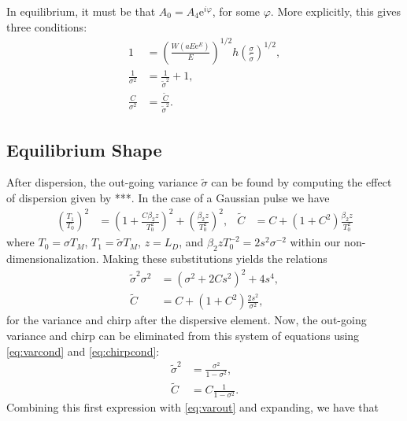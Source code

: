 In equilibrium, it must be that $A_0 = A_4 \textrm{e}^{i \varphi}$, for some $\varphi$. More explicitly, this gives three conditions:
\begin{subequations}
\begin{align}
\label{eq:energycond}
1 &= \left( \frac{W(a E \textrm{e}^E)}{E} \right)^{1/2} h \left( \frac{\sigma}{\widetilde{\sigma}} \right)^{1/2}, \\
\label{eq:varcond}
\frac{1}{\sigma^2} &= \frac{1}{\widetilde{\sigma}^2} + 1, \\
\label{eq:chirpcond}
\frac{C}{\sigma^2} &= \frac{\widetilde{C}}{\widetilde{\sigma}^2}.
\end{align}
\end{subequations}

\subsection{Equilibrium Shape}
After dispersion, the out-going variance $\widetilde{\sigma}$ can be found by computing the effect of dispersion given by ***. In the case of a Gaussian pulse \cite{agrawal2013} we have
\begin{align*}
\left( \frac{T_1}{T_0} \right)^2 &= \left( 1 + \frac{C \beta_2 z}{T_0^2} \right)^2 + \left( \frac{ \beta_2 z}{T_0^2} \right)^2,&
\widetilde{C} &= C + (1+C^2) \frac{\beta_2 z}{T_0^2}
\end{align*}
where $T_0 = \sigma T_M$, $T_1 = \widetilde{\sigma} T_M$, $z = L_D$, and $\beta_2 z T_0^{-2} = 2s^2\sigma^{-2}$ within our non-dimensionalization. Making these substitutions yields the relations
\begin{subequations}
\begin{align}
\label{eq:varout}
\widetilde{\sigma}^2 \sigma^2 &= \left( \sigma^2 + 2 C s^2 \right)^2 + 4s^4, \\
\label{eq:chirpout}
\widetilde{C} &= C + (1+C^2) \frac{2 s^2}{\sigma^2},
\end{align}
\end{subequations}
for the variance and chirp after the dispersive element. Now, the out-going variance and chirp can be eliminated from this system of equations using \eqref{eq:varcond} and \eqref{eq:chirpcond}:
\begin{align*}
\widetilde{\sigma}^2 &= \frac{\sigma^2}{1 - \sigma^2}, \\
\widetilde{C} &= C \frac{1}{1 - \sigma^2}.
\end{align*}
Combining this first expression with \eqref{eq:varout} and expanding, we have that

